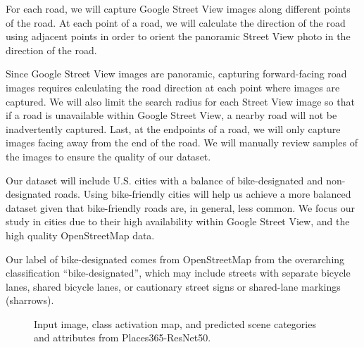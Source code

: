 \documentclass[10pt,twocolumn,letterpaper]{article}
\begin{document}
For each road, we will capture Google Street View images along different points of the road. At each point of a road, we will calculate the direction of the road using adjacent points in order to orient the panoramic Street View photo in the direction of the road. 

Since Google Street View images are panoramic, capturing forward-facing road images requires calculating the road direction at each point where images are captured. We will also limit the search radius for each Street View image so that if a road is unavailable within Google Street View, a nearby road will not be inadvertently captured. Last, at the endpoints of a road, we will only capture images facing away from the end of the road. We will manually review samples of the images to ensure the quality of our dataset.

Our dataset will include U.S. cities with a balance of bike-designated and non-designated roads. Using bike-friendly cities will help us achieve a more balanced dataset given that bike-friendly roads are, in general, less common. We focus our study in cities due to their high availability within Google Street View, and the high quality OpenStreetMap data.

Our label of bike-designated comes from OpenStreetMap from the overarching classification ``bike-designated'', which may include streets with separate bicycle lanes, shared bicycle lanes, or cautionary street signs or shared-lane markings (sharrows). 


\begin{figure}
\begin{center}
   
\end{center}
   \caption{Input image, class activation map, and predicted scene categories and attributes from Places365-ResNet50.}
\label{fig:short}
\end{figure}
\end{document}
